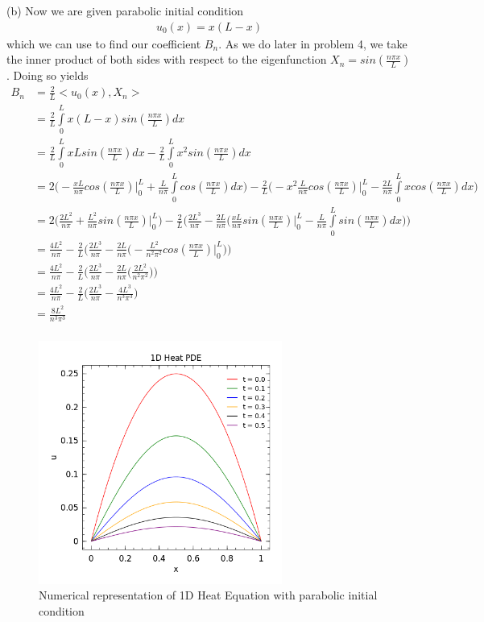\documentclass[10pt]{article}
\begin{document}
\newpage

\noindent (b) Now we are given parabolic initial condition 
\begin{align*}
u_0(x) = x(L-x)
\end{align*}
which we can use to find our coefficient $B_n$. As we do later in problem 4, we take the inner product of both sides with respect to the eigenfunction $X_n = sin(\frac{n\pi x}{L})$. Doing so yields 
\begin{align*}
B_n & = \frac{2}{L}<u_0(x), X_n> \\
& = \frac{2}{L}\int\limits_0^L x(L-x)sin(\frac{n\pi x}{L}) dx \\
& = \frac{2}{L}\int\limits_0^L xLsin(\frac{n\pi x}{L}) dx - \frac{2}{L}\int\limits_0^L x^2sin(\frac{n\pi x}{L}) dx \\
& = 2\bigg(-\frac{xL}{n\pi}cos(\frac{n\pi x}{L})\bigg\vert_0^L + \frac{L}{n\pi}\int\limits_0^L cos(\frac{n\pi x}{L}) dx \bigg) - \frac{2}{L}\bigg(-x^2\frac{L}{n\pi}cos(\frac{n\pi x}{L})\bigg\vert_0^L - 
\frac{2L}{n\pi}\int\limits_0^L xcos(\frac{n\pi x}{L}) dx\bigg) \\ 
& = 2\bigg(\frac{2L^2}{n\pi} + \frac{L^2}{n\pi}sin(\frac{n\pi x}{L})\bigg\vert_0^L\bigg) - \frac{2}{L}\bigg(\frac{2L^3}{n\pi} - \frac{2L}{n\pi}\bigg(\frac{xL}{n\pi}sin(\frac{n\pi x}{L})\bigg\vert_0^L - \frac{L}{n\pi}\int\limits_0^L sin(\frac{n\pi x}{L}) dx\bigg)\bigg) \\
& = \frac{4L^2}{n\pi} - \frac{2}{L}\bigg(\frac{2L^3}{n\pi} - \frac{2L}{n\pi}\bigg(-\frac{L^2}{n^2\pi^2}cos(\frac{n\pi x}{L})\bigg\vert_0^L\bigg)\bigg) \\ 
& = \frac{4L^2}{n\pi} - \frac{2}{L}\bigg(\frac{2L^3}{n\pi} - \frac{2L}{n\pi}\bigg(\frac{2L^2}{n^2\pi^2}\bigg)\bigg) \\
& = \frac{4L^2}{n\pi} - \frac{2}{L}\bigg(\frac{2L^3}{n\pi} - \frac{4L^3}{n^3\pi^3}\bigg) \\
& = \frac{8L^2}{n^3\pi^3} \\
\end{align*}

\newpage

\begin{figure}[h]
\centering
\includegraphics[width=8cm]{HW2_3b.png}
\caption{Numerical representation of 1D Heat Equation with parabolic initial condition}
\end{figure}
\end{document}
